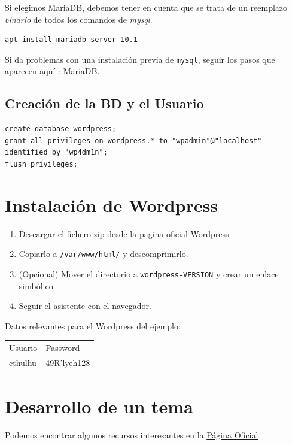 \documentclass[11pt]{article}
\begin{document}
Si elegimos MariaDB, debemos tener en cuenta que se trata de un reemplazo
\emph{binario} de todos los comandos de \emph{mysql}.

\begin{verbatim}
apt install mariadb-server-10.1
\end{verbatim}

Si da problemas con una instalación previa de \verb~mysql~, seguir los pasos que
aparecen aquí : \href{https://mariadb.com/kb/en/library/the-community-mariadb-troubles-only-running-after-reboot-times-out-when-try/}{MariaDB}.

\subsection{Creación de la BD y el Usuario}
\label{sec-1-4}

\begin{verbatim}
create database wordpress;
grant all privileges on wordpress.* to "wpadmin"@"localhost" identified by "wp4dm1n";
flush privileges;
\end{verbatim}


\section{Instalación de Wordpress}
\label{sec-2}

\begin{enumerate}
\item Descargar el fichero zip desde la pagina oficial \href{https://wordpress.org/download/}{Wordpress}
\item Copiarlo a \verb~/var/www/html/~ y descomprimirlo.
\item (Opcional) Mover el directorio a \verb~wordpress-VERSION~ y crear un enlace
simbólico.
\item Seguir el asistente con el navegador.
\end{enumerate}

Datos relevantes para el Wordpress del ejemplo:

\begin{center}
\begin{tabular}{ll}
Usuario & Password\\
cthulhu & 49R'lyeh128\\
\end{tabular}
\end{center}

\section{Desarrollo de un tema}
\label{sec-3}

Podemos encontrar algunos recursos interesantes en la
\href{https://developer.wordpress.org/themes/getting-started/setting-up-a-development-environment/}{Página Oficial} 
\end{document}
